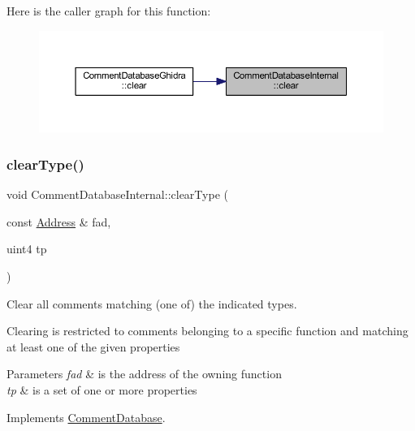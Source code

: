 Here is the caller graph for this function\+:
\nopagebreak
\begin{figure}[H]
\begin{center}
\leavevmode
\includegraphics[width=350pt]{class_comment_database_internal_a19c22a8d1e9ea5ea38c321e778e7c063_icgraph}
\end{center}
\end{figure}
\mbox{\label{class_comment_database_internal_a5ab44b5d53ca52aef756c9ad476e2b34}} 
\subsubsection{\texorpdfstring{clearType()}{clearType()}}
{\footnotesize\ttfamily void Comment\+Database\+Internal\+::clear\+Type (\begin{DoxyParamCaption}\item[{const \mbox{\hyperlink{class_address}{Address}} \&}]{fad,  }\item[{uint4}]{tp }\end{DoxyParamCaption})\hspace{0.3cm}{\ttfamily [virtual]}}



Clear all comments matching (one of) the indicated types. 

Clearing is restricted to comments belonging to a specific function and matching at least one of the given properties 
\begin{DoxyParams}{Parameters}
{\em fad} & is the address of the owning function \\
\hline
{\em tp} & is a set of one or more properties \\
\hline
\end{DoxyParams}


Implements \mbox{\hyperlink{class_comment_database_af4467b35ea8555ddc77e810453051a96}{Comment\+Database}}.



